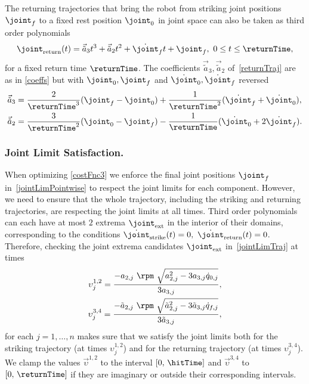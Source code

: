 %
The returning trajectories that bring the robot from striking joint positions $\joint_f$ to a fixed rest position $\joint_0$ in joint space can also be taken as third order polynomials
%
\begin{align}
\joint_{\mathrm{return}}(t) = \vec{\tilde{a}}_3 t^3  + \vec{\tilde{a}}_2 t^2 + \dot{\joint}_f t + \joint_f, \ 0 \leq t \leq \returnTime,
\label{returnTraj}
\end{align}
%
\noindent for a fixed return time $\returnTime$. The coefficients $\vec{\tilde{a}}_3, \vec{\tilde{a}}_2$ of~\eqref{returnTraj} are as in \eqref{coeffs} but with $\joint_0, \joint_f$ and $\dot{\joint}_0, \dot{\joint}_f$ reversed
%
\begin{align}
\vec{\tilde{a}}_3 &= \frac{2}{\returnTime^3}(\joint_f - \joint_0) + \frac{1}{\returnTime^2}(\dot{\joint}_f + \dot{\joint}_0), \\
\vec{\tilde{a}}_2 &= \frac{3}{\returnTime^2}(\joint_0 - \joint_f) - \frac{1}{\returnTime}(\dot{\joint}_0 + 2\dot{\joint}_f).
\label{returnCoeffs}
\end{align}
%
\subsubsection*{\textbf{Joint Limit Satisfaction}.} When optimizing \eqref{costFnc3} we enforce the final joint positions $\joint_f$ in~\eqref{jointLimPointwise} to respect the joint limits for each component. However, we need to ensure that the whole trajectory, including the striking and returning trajectories, are respecting the joint limits at all times. Third order polynomials can each have at most $2$ extrema $\joint_{\mathrm{ext}}$ in the interior of their domains, corresponding to the conditions $\dot{\joint}_{\mathrm{strike}}(t) = 0, \ \dot{\joint}_{\mathrm{return}}(t) = 0$. Therefore, checking the joint extrema candidates  $\joint_{\mathrm{ext}}$ in~\eqref{jointLimTraj} at times
%
\begin{align}
\upsilon_{j}^{1,2} = \frac{-a_{2,j} \ \rpm \ \sqrt{a_{2,j}^2 - 3a_{3,j}\dot{q}_{0,j}}}{3a_{3,j}}, \\
\upsilon_{j}^{3,4} = \frac{-\tilde{a}_{2,j} \ \rpm \ \sqrt{\tilde{a}_{2,j}^2 - 3\tilde{a}_{3,j}\dot{q}_{f,j}}}{3\tilde{a}_{3,j}},
\label{jointPosExtrema}
\end{align}
%
\noindent for each $j = 1, \ldots, n$ makes sure that we satisfy the joint limits both for the striking trajectory (at times $\upsilon_{j}^{1,2}$) and for the returning trajectory (at times $\upsilon_{j}^{3,4}$). We clamp the values $\vec{\upsilon}^{1,2}$ to the interval $[0, \, \hitTime]$ and $\vec{\upsilon}^{3,4}$ to $[0, \, \returnTime]$ if they are imaginary or outside their corresponding intervals. 

